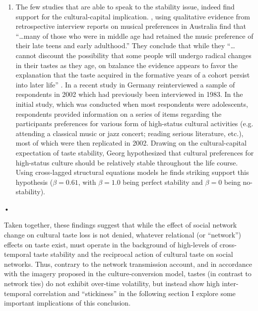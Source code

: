 \begin{enumerate}
\item The few studies that are able to speak to the stability issue, indeed find support for the cultural-capital implication.  \citep[178]{bennett_etal99}, using qualitative evidence from retrospective interview reports on musical preferences in Australia find that ``{\ldots}many of those who were in middle age had retained  the music preference of their late teens and early adulthood.'' They conclude that while they ``{\ldots}cannot discount the possibility that some people will undergo radical changes in their tastes as they age, on bzalance the evidence appears to favor the explanation that the taste acquired in the formative years of a cohort persist into later life'' \citep[180]{bennett_etal99}.  In a recent study in Germany \citet{georg04}  reinterviewed a sample of respondents in 2002 which had previously been interviewed in 1983.  In the initial study, which was conducted when most respondents were adolescents, respondents provided information on a series of items regarding the participants preferences for various form of high-status cultural activities (e.g. attending a classical music or jazz concert; reading serious literature, etc.), most of which were then replicated in 2002. Drawing on the cultural-capital expectation of taste stability, Georg hypothesized that cultural preferences for high-status culture should be relatively stable throughout the life course. Using cross-lagged structural equations models he finds striking support this hypothesis ($\beta=0.61$, with $\beta=1.0$ being perfect stability and $\beta=0$ being no-stability).
\end{enumerate}•

Taken together, these findings suggest that while the effect of social network change on cultural taste loss is not denied, whatever relational (or ``network'') effects on taste exist, must operate in the background of high-levels of cross-temporal taste stability and the reciprocal action of cultural taste on social networks. Thus, contrary to the network transmission account, and in accordance with the imagery proposed in the culture-conversion model, tastes (in contrast to network ties) do not exhibit over-time volatility, but instead show high inter-temporal correlation and ``stickiness'' in the following section I explore some important implications of this conclusion. 
